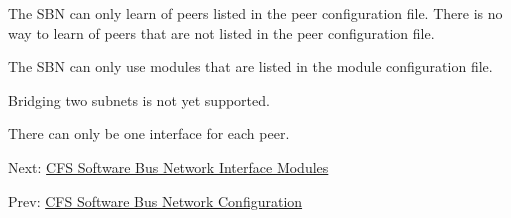 
\begin{DoxyItemize}
\item The S\-B\-N can only learn of peers listed in the peer configuration file. There is no way to learn of peers that are not listed in the peer configuration file. 
\item The S\-B\-N can only use modules that are listed in the module configuration file. 
\item Bridging two subnets is not yet supported. 
\item There can only be one interface for each peer. 
\end{DoxyItemize}

Next\-: \hyperlink{cfssbnmod}{C\-F\-S Software Bus Network Interface Modules} \par
 Prev\-: \hyperlink{cfssbncfg}{C\-F\-S Software Bus Network Configuration} 